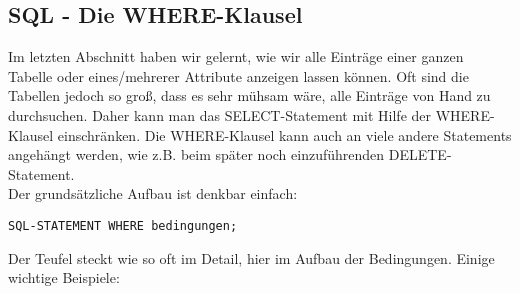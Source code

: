 \subsection[WHERE-Klausel]{SQL - Die WHERE-Klausel}
Im letzten Abschnitt haben wir gelernt, wie wir alle Einträge einer ganzen Tabelle oder eines/mehrerer Attribute anzeigen lassen können. Oft sind die Tabellen jedoch so groß, dass es sehr mühsam wäre, alle Einträge von Hand zu durchsuchen. Daher kann man das SELECT-Statement mit Hilfe der WHERE-Klausel einschränken. Die WHERE-Klausel kann auch an viele andere Statements angehängt werden, wie z.B. beim später noch einzuführenden DELETE-Statement.\\
Der grundsätzliche Aufbau ist denkbar einfach:
\begin{tcolorbox}[title=WHERE-Klausel]
	\lstinline!SQL-STATEMENT WHERE bedingungen;!
\end{tcolorbox}
Der Teufel steckt wie so oft im Detail, hier im Aufbau der Bedingungen. Einige wichtige Beispiele:
